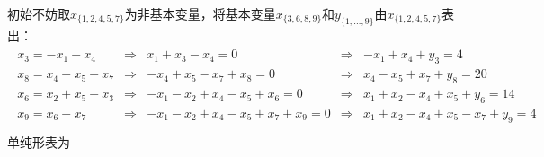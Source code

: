 \documentclass{ctexart}
\begin{document}
初始不妨取$x_{\{1, 2, 4, 5, 7\}}$为非基本变量，将基本变量$x_{\{3, 6, 8, 9\}}$和$y_{\{1, \ldots, 9\}}$由$x_{\{1, 2, 4, 5, 7\}}$表出：
\begin{align*}
    \begin{array}{rclcl}
        x_3 = -x_1 + x_4      & \Rightarrow & x_1 + x_3 - x_4 = 0                    & \Rightarrow & -x_1 + x_4 + y_3 = 4                  \\
        x_8 = x_4 - x_5 + x_7 & \Rightarrow & -x_4 + x_5 - x_7 + x_8 = 0             & \Rightarrow & x_4 - x_5 + x_7 + y_8 = 20            \\
        x_6 = x_2 + x_5 - x_3 & \Rightarrow & -x_1 - x_2 + x_4 - x_5 + x_6 = 0       & \Rightarrow & x_1 + x_2 - x_4 + x_5 + y_6 = 14      \\
        x_9 = x_6 - x_7       & \Rightarrow & -x_1 - x_2 + x_4 - x_5 + x_7 + x_9 = 0 & \Rightarrow & x_1 + x_2 - x_4 + x_5 - x_7 + y_9 = 4 \\
    \end{array}
\end{align*}
单纯形表为
\end{document}
